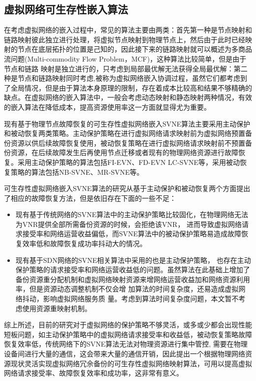 \subsection{虚拟网络可生存性嵌入算法}
在考虑虚拟网络的嵌入过程中，常见的算法主要由两类：首先第一种是节点映射和链路映射彼此独立进行处理，将虚拟节点映射到物理节点上，然后由于此时已经映射的节点在底层拓扑的位置是己知的，因此接下来的链路映射就可以概述为多商品流问题\cite{even1975complexity}(Multi-commodity Flow Problem，MCF)，这种算法比较简单，但是由于节点和链路 映射是独立进行的，只考虑到局部最优解无法获得全局最优解：第二种是节点和链路映射同时考虑,被称为虚拟网络嵌入协调过程，虽然它们都考虑到了全局情况，但是由于算法本身原理的限制，存在着成本比较高和结果不够精确的缺点。在虚拟网络的嵌入算法中，一般会考虑动态映射和静态映射两种情况，有效的嵌入算法在降低成本，提高资源使用率这一方面就显得尤为重要。



现有基于物理节点故障恢复的可生存性虚拟网络嵌入SVNE算法主要采用主动保护\cite{yu2011cost,wang2014survivable,sun2010efficient,hu2012location} 和被动恢复\cite{rahman2010survivable,qiang2014heuristic,bo2014dynamic}两类策略。主动保护策略在进行虚拟网络请求映射前为虚拟网络预置备份资源以供后续故障恢复使用，被动恢复策略在进行虚拟网络请求映射前不预置备份资源，在后续故障发生后再使用节点迁移或者现有的物理网络资源进行故障恢复。采用主动保护策略的算法包括FI-EVN\cite{yu2011cost}、FD-EVN\cite{wang2014survivable} LC-SVNE\cite{hu2012location}等，采用被动恢复策略的算法包括NB-SVNE\cite{bo2014dynamic}、MR-SVNE\cite{qiang2014heuristic}等。

可生存性虚拟网络嵌入SVNE算法的研究从基于主动保护和被动恢复两个方面提出了相应的故障恢复方法，但是依旧存在下面的一些不足：
\begin{itemize}
  \item 现有基于传统网络的SVNE算法中的主动保护策略比较固化，在物理网络无法为VNR提供全部所需备份资源的时候，会拒绝该VNR， 进而导致虚拟网络请求接受率和网络运营收益偏低，而SVNE算法中的被动保护策略易造成故障恢复效率低和故障恢复成功率抖动大的情况。
  \item 现有基于SDN网络的SVNE相关算法中采用的也是主动保护策略， 也存在主动保护策略的请求接受率和网络运营收益低的问题。虽然算法在此基础上增加了备份资源重分配机制和虚拟网络映射资源来增网络运营收益加和网络资源利用率，但是资源动态调整机制不仅会增 加算法的时间复杂度，还易造成虚拟网络抖动，影响虚拟网络服务质 量。考虑到算法时间复杂度问题，本文暂不考虑使用资源重映射机制。
\end{itemize}

综上所述，目前的研究对于虚拟网络的保护策略不够灵活，或多或少都会出现性能短板问题，如主动保护策略中的虚拟网络请求接受率和收益低，被动恢复策略故障恢复效率低，传统网络下的SVNE算法无法对物理资源进行集中管控, 需要在物理设备间进行大量的通信，这会带来大量的通信开销，因此提出一个根据物理网络资源现状灵活实现虚拟网络冗佘备份的可生存性虚拟网络映射算法，可用以提高虚拟网络请求接受率、故障恢复效率和成功率，这非常有意义。

